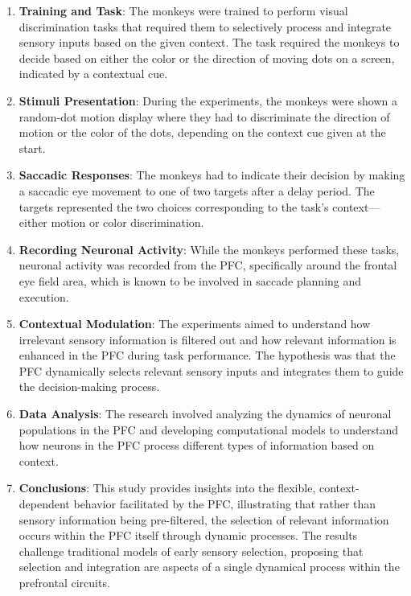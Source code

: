 \documentclass[11pt]{book} %
\begin{document}
\begin{enumerate}
    \item \textbf{Training and Task}: The monkeys were trained to perform visual discrimination tasks that required them to selectively process and integrate 
    sensory inputs based on the given context. The task required the monkeys to decide based on either the color 
    or the direction of moving dots on a screen, indicated by a contextual cue.

    \item \textbf{Stimuli Presentation}: During the experiments, the monkeys were shown a random-dot motion display where
     they had to discriminate the direction of motion or the color of the dots, depending on the context cue given at the start.

    \item \textbf{Saccadic Responses}: The monkeys had to indicate their decision by making a saccadic eye movement to 
    one of two targets after a delay period. The targets represented the two choices corresponding 
    to the task's context—either motion or color discrimination.

    \item \textbf{Recording Neuronal Activity}: While the monkeys performed these tasks, neuronal activity was recorded from the PFC, 
    specifically around the frontal eye field area, which is known to be involved in saccade planning and execution.

    \item \textbf{Contextual Modulation}: The experiments aimed to understand how irrelevant sensory information is filtered out and 
    how relevant information is enhanced in the PFC during task performance. 
    The hypothesis was that the PFC dynamically selects relevant sensory inputs and integrates them to guide the decision-making process.

    \item \textbf{Data Analysis}: The research involved analyzing the dynamics of neuronal populations in the PFC 
    and developing computational models to understand how neurons in the PFC process different types of information based on context.
    
    \item \textbf{Conclusions}: This study provides insights into the flexible, context-dependent behavior facilitated by the PFC, 
    illustrating that rather than sensory information being pre-filtered, the selection of relevant information occurs within the 
    PFC itself through dynamic processes. The results challenge traditional models of early sensory selection, 
    proposing that selection and integration are aspects of a single dynamical process within the prefrontal circuits.
\end{enumerate}
\end{document}
